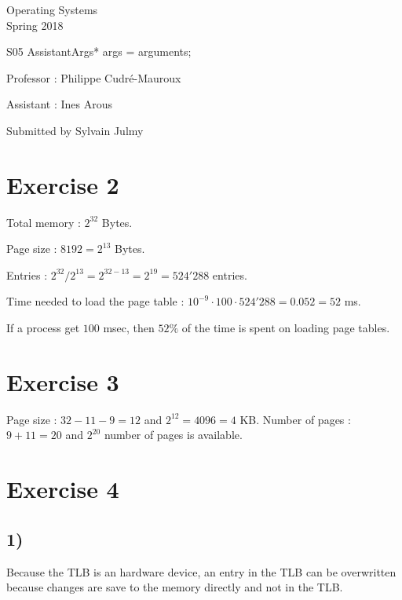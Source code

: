 \documentclass[a4paper,11pt]{report}
\author{Sylvain Julmy}
\date{\today}
\begin{document}
\begin{center}
  \Large{
    Operating Systems\\
    Spring 2018
  }
  
  \noindent\makebox[\linewidth]{\rule{\linewidth}{0.4pt}}
  S05
  \noindent\makebox[\linewidth]{\rule{\linewidth}{0.4pt}}
    AssistantArgs* args = arguments;
  \begin{flushleft}
    Professor : Philippe Cudré-Mauroux

    Assistant : Ines Arous
  \end{flushleft}
  
  \noindent\makebox[\linewidth]{\rule{\linewidth}{0.4pt}}

  Submitted by Sylvain Julmy
  
  \noindent\makebox[\linewidth]{\rule{\textwidth}{1pt}}
\end{center}

\section*{Exercise 2}

Total memory : $2^{32}$ Bytes.

Page size : $8192 = 2^{13}$ Bytes.

Entries : $2^{32} / 2^{13} = 2^{32-13} = 2^{19} = 524'288$ entries.

Time needed to load the page table : $10^{-9} \cdot 100 \cdot 524'288 = 0.052 =
52$ ms.

If a process get $100$ msec, then $52\%$ of the time is spent on loading page tables.

\section*{Exercise 3}

Page size : $32 - 11 - 9 = 12$ and $2^{12} = 4096 = 4$ KB.
Number of pages : $9 + 11 = 20$ and $2^{20}$ number of pages is available.

\section*{Exercise 4}

\subsection*{1)}

Because the TLB is an hardware device, an entry in the TLB can be overwritten
because changes are save to the memory directly and not in the TLB.
\end{document}
